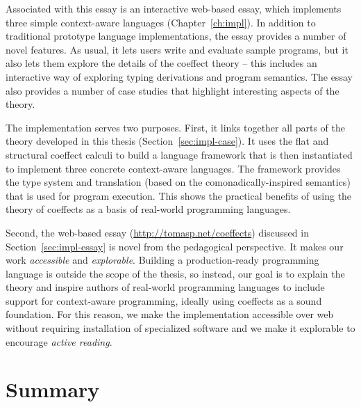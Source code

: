 Associated with this essay is an interactive web-based essay, which implements three simple
context-aware languages (Chapter~\ref{ch:impl}). In addition to traditional prototype language
implementations, the essay provides a number of novel features. As usual, it lets users
write and evaluate sample programs, but it also lets them explore the details of the coeffect
theory -- this includes an interactive way of exploring typing derivations and program semantics.
The essay also provides a number of case studies that highlight interesting aspects of the theory.

The implementation serves two purposes. First, it links together all parts
of the theory developed in this thesis (Section~\ref{sec:impl-case}). It uses the flat and structural
coeffect calculi to build a language framework that is then instantiated to implement three concrete
context-aware languages. The  framework provides the type system and translation (based on the
comonadically-inspired semantics) that is used for program execution. This shows the practical
benefits of using the theory of coeffects as a basis of real-world programming languages.

Second, the web-based essay (\url{http://tomasp.net/coeffects}) discussed in Section~\ref{sec:impl-essay}
is novel from the pedagogical perspective. It makes our work \emph{accessible} and \emph{explorable}.
Building a production-ready programming language is outside the scope of the  thesis, so instead,
our goal is to explain the theory and inspire authors of real-world programming languages to
include support for context-aware programming, ideally using coeffects as a sound foundation.
For this reason, we make the implementation accessible over web without requiring installation
of specialized software and we make it explorable to encourage \emph{active reading}.

%
%

\section{Summary}
\label{sec:conc-conclusions}

